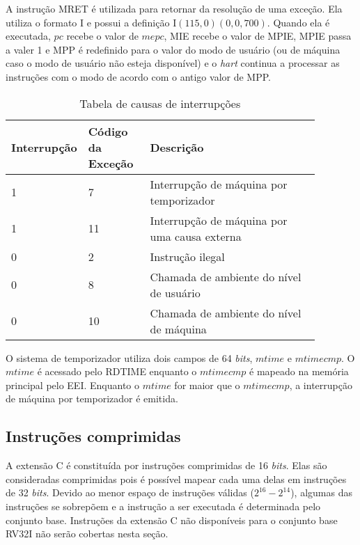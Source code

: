   A instrução MRET é utilizada para retornar da resolução de uma exceção. Ela utiliza o formato I e possui a definição
  I$(115, 0)(0, 0, 700)$. Quando ela é executada, $pc$ recebe o valor de $mepc$, MIE recebe o valor de MPIE, MPIE 
  passa a valer 1 e MPP é redefinido para o valor do modo de usuário (ou de máquina caso o modo de usuário não esteja 
  disponível) e o \emph{hart} continua a processar as instruções com o modo de acordo com o antigo valor de MPP.

  \begin{table}
    \begin{tabular}{ |p{0.13\linewidth}||p{0.2\linewidth}|p{0.55\linewidth}| } 
      \hline
      Interrupção & Código da Exceção & Descrição \\ \hline \hline

1 & 7 & Interrupção de máquina por temporizador \\ \hline
1 & 11 & Interrupção de máquina por uma causa externa \\ \hline
0 & 2 & Instrução ilegal \\ \hline
0 & 8 & Chamada de ambiente do nível de usuário \\ \hline
0 & 10 &  Chamada de ambiente do nível de máquina \\ \hline

    \end{tabular}
  \caption{Tabela de causas de interrupções \label{tab:icause}}
  \end{table}

  O sistema de temporizador utiliza dois campos de 64 \emph{bits}, $mtime$ e $mtimecmp$.
  O $mtime$ é acessado pelo RDTIME enquanto o $mtimecmp$ é mapeado na memória principal pelo EEI.
  Enquanto o $mtime$ for maior que o $mtimecmp$, a interrupção de máquina por temporizador é
  emitida.

\subsection{Instruções comprimidas}
\label{sec:C}

  A extensão C é constituída por instruções comprimidas de 16 \emph{bits}. Elas são consideradas comprimidas
  pois é possível mapear cada uma delas em instruções de 32 \emph{bits}. Devido ao menor espaço de instruções 
  válidas ($2^{16} - 2^{14}$), algumas das instruções se 
  sobrepõem e a instrução a ser executada é determinada pelo conjunto base. Instruções 
  da extensão C não disponíveis para o conjunto base RV32I não serão cobertas nesta seção.


